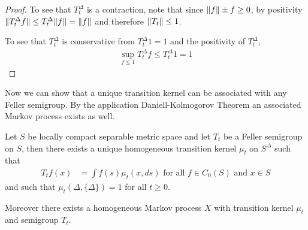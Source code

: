 \begin{proof}
To see that $T^\Delta_t$ is a contraction, note that since $\lVert f \rVert \pm f \geq 0$, by positivity $\lVert T^\Delta_t f \rVert \leq T^\Delta_t \lVert f \rVert = \lVert f \rVert$ and therefore $\lVert T_t \rVert \leq 1$.

To see that $T^\Delta_t$ is conservative from $T^\Delta_t 1 = 1$ and the positivity of $T^\Delta_t$,
\begin{align*}
\sup_{f \leq 1} T^\Delta_t f \leq T^\Delta_t 1 = 1
\end{align*}
\end{proof}

Now we can show that a unique transition kernel can be associated with
any Feller semigroup.  By the application Daniell-Kolmogorov Theorem an associated
Markov process exists as well.

\begin{prop}\label{FellerSemigroupToTransitionKernel}Let $S$ be locally compact separable metric space and let $T_t$ be a Feller semigroup on $S$, then there exists
a unique homogeneous transition kernel $\mu_t$ on $S^\Delta$ such that
\begin{align*}
T_t f(x) &= \int f(s) \mu_t(x, ds) \text{ for all $f \in C_0(S)$ and $x \in S$}
\end{align*}
and such that $\mu_t(\Delta, \lbrace \Delta \rbrace) =1$ for all $t \geq 0$.
\end{prop}
Moreover there exists a homogeneous Markov process $X$ with transition kernel $\mu_t$ and semigroup $T_t$.
